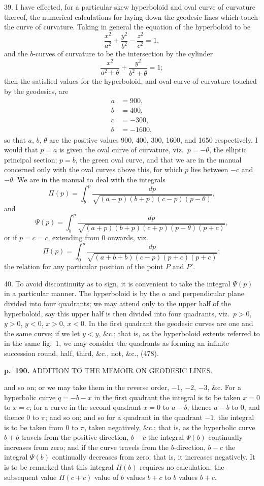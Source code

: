 \documentclass[11pt,a4paper]{book}
\begin{document}
39. I have effected, for a particular skew hyperboloid and oval curve of curvature thereof, the numerical calculations for laying down the geodesic lines which touch the curve of curvature.  Taking in general the equation of the hyperboloid to be
\[
\frac{x^2}{a^2} + \frac{y^2}{b^2} - \frac{z^2}{c^2} = 1,
\]
and the $b$-curves of curvature to be the intersection by the cylinder
\[
\frac{x^2}{a^2 + \theta} + \frac{y^2}{b^2 + \theta} = 1;
\]
then the satisfied values for the hyperboloid, and oval curve of curvature touched by
the geodesics, are
\begin{align*}
a &= 900, \\
b &= 400, \\
c &= -300, \\
\theta &= -1600,
\end{align*}
so that $a$, $b$, $\theta$ are the positive values 900, 400, 300, 1600, and 1650 respectively. I would that $p = a$ is given the oval curve of curvature, viz.\ $p = -\theta$, the elliptic principal section; $p = b$, the green oval curve, and that we are in the manual concerned only with the oval curves above this, for which $p$ lies between $-c$ and $-\theta$. We are in the manual to deal with the integrals
\[
\Pi(p) = \int_b^{p} \frac{dp}{\sqrt{(a + p)(b + p)(c - p)(p - \theta)}},
\]
and
\[
\Psi(p) = \int_b^{p} \frac{dp}{\sqrt{(a + p)(b + p)(c + p)(p - \theta)(p + c)}},
\]
or if $p = c = c$, extending from 0 onwards, viz.
\[
\Pi(p) = \int_0^{p} \frac{dp}{\sqrt{(a + b + b)(c - p)(p + c)(p + c)}};
\]
the relation for any particular position of the point $P$ and $P'$.

40. To avoid discontinuity as to sign, it is convenient to take the integral $\Psi(p)$ in a particular manner.  The hyperboloid is by the $\alpha$ and perpendicular plane divided into four quadrants; we may attend only to the upper half of the hyperboloid, say this upper half is then divided into four quadrants, viz.\ $p > 0$, $y > 0$, $y < 0$, $x > 0$, $x < 0$. In the first quadrant the geodesic curves are one and the same curve; if we let $y < y$, \&c.; that is, as the hyperboloid extents referred to in the same fig.\ 1, we may consider the quadrants as forming an infinite succession round, half, third, \&c., not, \&c., (478).

\clearpage

\noindent
\textbf{p.~190.}  ADDITION TO THE MEMOIR ON GEODESIC LINES.

and so on; or we may take them in the reverse order, $-1$, $-2$, $-3$, \&c. For a hyperbolic curve $q = -b - x$ in the first quadrant the integral is to be taken $x = 0$ to $x = c$;  for a curve in the second quadrant $x = 0$ to $a - b$, thence $a - b$ to $0$, and thence $0$ to $\pi$; and so on; and so for a quadrant in the quadrant $-1$, the integral is to be taken from $0$ to $\pi$, taken negatively, \&c.; that is, as the hyperbolic curve $b + b$ travels from the positive direction, $b - c$ the integral $\Psi(b)$ continually increases from zero; and if the curve travels from the $b$-direction, $b - c$ the integral $\Psi(b)$ continually decreases from zero; that is, it increases negatively.  It is to be remarked that this integral $\Pi(b)$ requires no calculation; the subsequent value $\Pi(c + c)$ value of $b$ values $b + c$ to $b$ values $b + c$.
\end{document}
